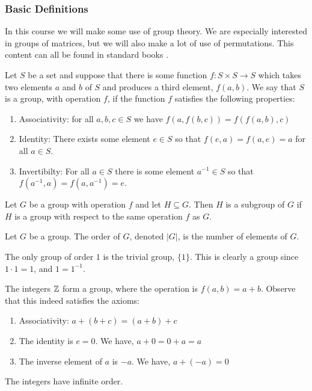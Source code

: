 \subsubsection{Basic Definitions}
In this course we will make some use of group theory. We are especially interested in groups of matrices, but we will also make a lot of use of permutations. This content can all be found in standard books \cite{Aluffi2009-wb,Dummit2003-rj,Jacobson2009-pp}.

\begin{defn}[Group]
Let $S$ be a set and suppose that there is some function $f : S \times S \to S$ which takes two elements $a$ and $b$ of $S$ and produces a third element, $f(a,b)$. We say that $S$ is a group, with operation $f$, if the function $f$ satisfies the following properties:
\begin{enumerate}
\item {
Associativity: for all $a,b,c \in S$ we have $f(a,f(b,c)) = f(f(a,b),c)$
}
\item {
Identity: There exists some element $e \in S$ so that $f(e,a) = f(a,e) = a$ for all $a \in S$.
}
\item {
Invertibilty: For all $a \in S$ there is some element $a^{-1}\in S$ so that $f(a^{-1},a) = f(a,a^{-1}) = e$.
}
\end{enumerate}
\end{defn}
\begin{defn}[Subgroup]
    Let $G$ be a group with operation $f$ and let $H\subseteq G$. Then $H$ is a subgroup of $G$ if $H$ is a group with respect to the same operation $f$ as $G$.
\end{defn}
\begin{defn}[Order]  Let $G$ be a group. The order of $G$, denoted $|G|$, is the number of elements of $G$.
\end{defn}
\begin{example}
    The only group of order $1$ is the trivial group, $\{1\}$. This is clearly a group since $1\cdot 1 = 1$, and $1=1^{-1}$.
\end{example}
\begin{example}[Integers]
The integers $\operatorname{\mathbb{Z}}$ form a group, where the operation is $f(a,b) = a+b$. Observe that this indeed satisfies the axioms:
\begin{enumerate}
\item {
Associativity: $a+(b+c) = (a+b)+c$
}
\item {
The identity is $e=0$. We have,
$a+0 = 0+a = a$
}
\item {
The inverse element of $a$ is $-a$. We have, $a + (-a) = 0$
}
\end{enumerate}
The integers have infinite order.
\end{example}

